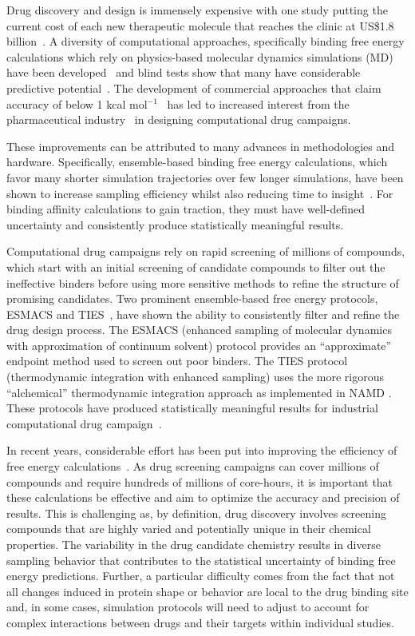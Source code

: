 Drug discovery and design is immensely expensive with one study putting the
current cost of each new therapeutic molecule that reaches the clinic at
US\$1.8 billion~\cite{Paul2010}. A diversity of computational approaches,
specifically binding free energy calculations which rely on physics-based
molecular dynamics simulations (MD) have been developed~\cite{Mobley2012}
and blind tests show that many have considerable predictive
potential~\cite{Mey2017,Yin2017}. The development of commercial approaches
that claim accuracy of below 1 kcal mol$^{-1}$~\cite{Wang2015} has led to
increased interest from the pharmaceutical industry~\cite{Ganesan2017} in
designing computational drug campaigns.

These improvements can be attributed to many advances in methodologies and
hardware. Specifically, ensemble-based binding free energy calculations,
which favor many shorter simulation trajectories over few longer simulations,
have been shown to increase sampling efficiency whilst also reducing time to
insight~\cite{weis_ligand_2006}. For binding affinity calculations to gain
traction, they must have well-defined uncertainty and consistently produce
statistically meaningful results.

Computational drug campaigns rely on rapid screening of millions of
compounds, which start with an initial screening of candidate compounds to
filter out the ineffective binders before using more sensitive methods to
refine the structure of promising candidates. Two prominent ensemble-based
free energy protocols, ESMACS and TIES~\cite{Bhati2017}, have shown the
ability to consistently filter and refine the drug design process. The ESMACS
(enhanced sampling of molecular dynamics with approximation of continuum
solvent) protocol provides an ``approximate'' endpoint method used to screen
out poor binders. The TIES protocol (thermodynamic integration with enhanced
sampling) uses the more rigorous ``alchemical'' thermodynamic integration
approach as implemented in NAMD \cite{Phillips2005, Straatsma1991}. These
protocols have produced statistically meaningful results for industrial
computational drug campaign~\cite{Wan2017brd4}.

In recent years, considerable effort has been put into improving the
efficiency of free energy calculations~\cite{Klimovich2015, Naden2016,
Kaus2013}. As drug screening campaigns can cover millions of compounds and
require hundreds of millions of core-hours, it is important that these
calculations be effective and aim to optimize the accuracy and precision of
results. This is challenging as, by definition, drug discovery involves
screening compounds that are highly varied and potentially unique in their
chemical properties. The variability in the drug candidate chemistry results
in diverse sampling behavior that contributes to the statistical uncertainty
of binding free energy predictions. Further, a particular difficulty comes
from the fact that not all changes induced in protein shape or behavior are
local to the drug binding site and, in some cases, simulation protocols will
need to adjust to account for complex interactions between drugs and their
targets within individual studies.

